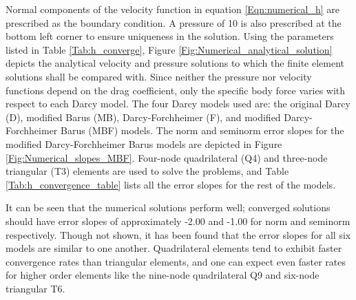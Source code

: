 \documentclass[11pt,reqno]{amsart}
\begin{document}
Normal components of the velocity function in equation \eqref{Eqn:numerical_h} 
are prescribed as the boundary condition. A pressure of 10 is also prescribed
at the bottom left corner to ensure uniqueness in the solution.
Using the parameters listed in Table \ref{Tab:h_converge}, 
Figure \ref{Fig:Numerical_analytical_solution} depicts the analytical velocity 
and pressure solutions to which the finite element solutions shall be compared 
with. Since neither the pressure nor velocity functions depend on the drag 
coefficient, only the specific body force varies with respect to each Darcy model.
The four Darcy models used are: the original Darcy (D), modified Barus (MB), 
Darcy-Forchheimer (F), and modified Darcy-Forchheimer Barus (MBF) models. 
The  norm and  seminorm error slopes for the modified Darcy-Forchheimer 
Barus models are depicted in Figure \ref{Fig:Numerical_slopes_MBF}. Four-node 
quadrilateral (Q4) and three-node triangular (T3) elements are used to solve 
the problems, and Table \ref{Tab:h_convergence_table} 
lists all the error slopes for the rest of the models.

It can be seen that the numerical solutions perform well; converged solutions should 
have error slopes of approximately -2.00 and -1.00 for  norm and  seminorm 
respectively. Though not shown, it has been found that 
the error slopes for all six models are similar to one another. Quadrilateral elements 
tend to exhibit faster convergence rates than triangular elements, and one can 
expect even faster rates for higher order
elements like the nine-node quadrilateral Q9 and six-node triangular T6.
\end{document}

